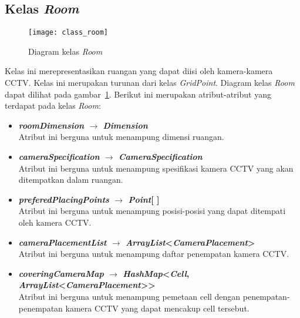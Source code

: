 \subsection{Kelas \textit{Room}}
\begin{figure}[H]
	\centering  
	\texttt{[image: class\_room]}
	\caption[Diagram kelas \textit{Room}]{Diagram kelas \textit{Room}}
	\label{fig:class_room}
\end{figure}

Kelas ini merepresentasikan ruangan yang dapat diisi oleh kamera-kamera CCTV. Kelas ini merupakan turunan dari kelas \textit{GridPoint}. Diagram kelas \textit{Room} dapat dilihat pada gambar~\ref{fig:class_room}. Berikut ini merupakan atribut-atribut yang terdapat pada kelas \textit{Room}:
\begin{itemize}
	\item \textbf{\textit{roomDimension} \(\rightarrow\) \textit{Dimension}}\\
	Atribut ini berguna untuk menampung dimensi ruangan.
	\item \textbf{\textit{cameraSpecification} \(\rightarrow\) \textit{CameraSpecification}}\\
	Atribut ini berguna untuk menampung spesifikasi kamera CCTV yang akan ditempatkan dalam ruangan.
	\item \textbf{\textit{preferedPlacingPoints} \(\rightarrow\) \textit{Point}[ ]}\\
	Atribut ini berguna untuk menampung posisi-posisi yang dapat ditempati oleh kamera CCTV.
	\item \textbf{\textit{cameraPlacementList} \(\rightarrow\) \textit{ArrayList}<\textit{CameraPlacement}>}\\
	Atribut ini berguna untuk menampung daftar penempatan kamera CCTV.
	\item \textbf{\textit{coveringCameraMap} \(\rightarrow\) \textit{HashMap}<\textit{Cell}, \textit{ArrayList}{<\textit{CameraPlacement}>}>}\\
	Atribut ini berguna untuk menampung pemetaan cell dengan penempatan-penempatan kamera CCTV yang dapat mencakup cell tersebut.
\end{itemize}

